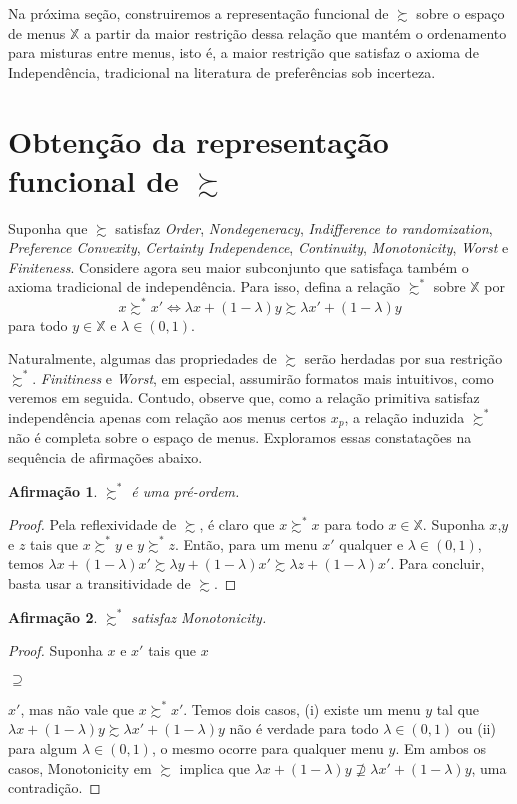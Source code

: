 \documentclass[11pt, a4paper]{article}
\theoremstyle{nonumberplain}
\newtheorem{proof}{Dem.}
\theoremstyle{plain}
\newtheorem{claim}{Afirmação}
\theoremstyle{plain}
\begin{document}
Na próxima seção, construiremos a representação funcional de $\succsim$ sobre o espaço de menus $\mathbb{X}$ a partir da maior restrição dessa relação que mantém o ordenamento para misturas entre menus, isto é, a maior restrição que satisfaz o axioma de Independência, tradicional na literatura de preferências sob incerteza. 

\section{Obtenção da representação funcional de $\succsim$}

Suponha que $\succsim$ satisfaz \textit{Order}, \textit{Nondegeneracy}, \textit{Indifference to randomization}, \textit{Preference Convexity}, \textit{Certainty Independence}, \textit{Continuity}, \textit{Monotonicity}, \textit{Worst} e \textit{Finiteness}. Considere agora seu maior subconjunto que satisfaça também o axioma tradicional de independência. Para isso, defina a relação $\succsim^*$ sobre $\mathbb{X}$ por $$x\succsim^* x' \Leftrightarrow \lambda x + (1-\lambda)y \succsim \lambda x' + (1-\lambda)y$$ para todo $y\in \mathbb{X}$ e $\lambda\in(0,1)$.

Naturalmente, algumas das propriedades de $\succsim$ serão herdadas por sua restrição $\succsim^*$. \textit{Finitiness} e \textit{Worst}, em especial, assumirão formatos mais intuitivos, como veremos em seguida. Contudo, observe que, como a relação primitiva satisfaz independência apenas com relação aos menus certos $x_p$, a relação induzida $\succsim^*$ não é completa sobre o espaço de menus. Exploramos essas constatações na sequência de afirmações abaixo.


\begin{claim}$\succsim^*$ é uma pré-ordem. \end{claim}
\begin{proof} Pela reflexividade de $\succsim$, é claro que $x\succsim^* x$ para todo $x\in \mathbb{X}$. Suponha $x$,$y$ e $z$ tais que $x\succsim^* y$ e $y\succsim^* z$. Então, para um menu $x'$ qualquer e $\lambda\in(0,1)$, temos $\lambda x + (1-\lambda)x'\succsim \lambda y + (1-\lambda)x'\succsim \lambda z + (1-\lambda)x'$. Para concluir, basta usar a transitividade de $\succsim$.
\end{proof}


\begin{claim}$\succsim^*$ satisfaz Monotonicity. \end{claim}
\begin{proof}
Suponha $x$ e $x'$ tais que $x$\begin{small}$\supseteq$\end{small}$x'$, mas não vale que $x\succsim^* x'$. Temos dois casos, (i) existe um menu $y$ tal que $\lambda x + (1-\lambda)y\succsim \lambda x' + (1-\lambda)y$ não é verdade para todo $\lambda\in(0,1)$ ou (ii) para algum $\lambda\in(0,1)$, o mesmo ocorre para qualquer menu $y$. Em ambos os casos, Monotonicity em $\succsim$ implica que $\lambda x + (1-\lambda)y \nsupseteq \lambda x' + (1-\lambda)y$, uma contradição.   
\end{proof}
\end{document}
